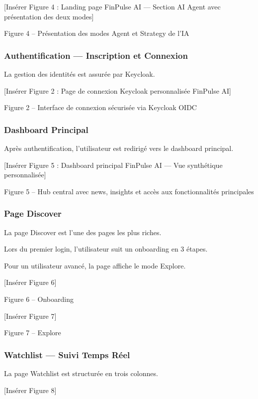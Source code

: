 [Insérer Figure 4 : Landing page FinPulse AI — Section AI Agent avec présentation des deux modes]

Figure 4 – Présentation des modes Agent et Strategy de l'IA

\subsubsection{Authentification — Inscription et Connexion}

La gestion des identités est assurée par Keycloak.

[Insérer Figure 2 : Page de connexion Keycloak personnalisée FinPulse AI]

Figure 2 – Interface de connexion sécurisée via Keycloak OIDC

\subsubsection{Dashboard Principal}

Après authentification, l'utilisateur est redirigé vers le dashboard principal.

[Insérer Figure 5 : Dashboard principal FinPulse AI — Vue synthétique personnalisée]

Figure 5 – Hub central avec news, insights et accès aux fonctionnalités principales

\subsubsection{Page Discover}

La page Discover est l'une des pages les plus riches.

Lors du premier login, l’utilisateur suit un onboarding en 3 étapes.

Pour un utilisateur avancé, la page affiche le mode Explore.

[Insérer Figure 6]

Figure 6 – Onboarding

[Insérer Figure 7]

Figure 7 – Explore

\subsubsection{Watchlist — Suivi Temps Réel}

La page Watchlist est structurée en trois colonnes.

[Insérer Figure 8]

